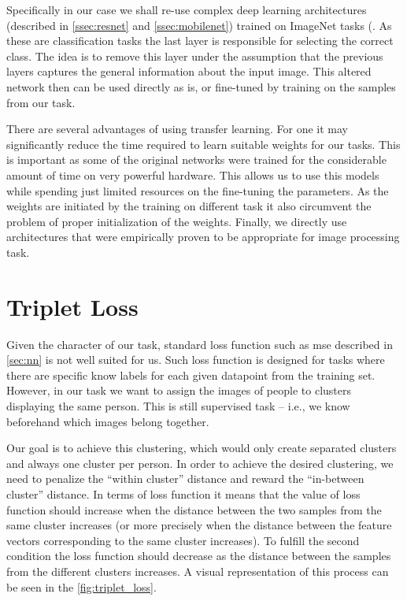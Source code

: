 Specifically in our case we shall re-use complex deep learning architectures
(described in \autoref{ssec:resnet} and \autoref{ssec:mobilenet}) trained on
ImageNet tasks (\cite{imagenetresults}. As these are classification tasks
the last layer is responsible for selecting the correct class. The idea
is to remove this layer under the assumption that the previous layers
captures the general information about the input image. This altered
network then can be used directly as is, or fine-tuned by training on the
samples from our task.

There are several advantages of using transfer learning. For one it may
significantly reduce the time required to learn suitable weights for our
tasks. This is important as some of the original networks were trained
for the considerable amount of time on very powerful hardware. This allows
us to use this models while spending just limited resources on the fine-tuning
the parameters. As the weights are initiated by the training on different
task it also circumvent the problem of proper initialization of the weights.
Finally, we directly use architectures that were empirically proven to be
appropriate for image processing task.


\section{Triplet Loss}

\label{sec:triplet_loss}

Given the character of our task, standard loss function such as \gls{mse}
described in \autoref{sec:nn} is not well suited for us. Such loss function
is designed for tasks where there are specific know labels for each given
datapoint from the training set. However, in our task we want to assign the
images of people to clusters displaying the same person. This is still
supervised task -- i.e., we know beforehand which images belong together.

Our goal is to achieve this clustering, which would only create separated clusters and always one cluster per person.
In order to achieve the desired clustering, we need to penalize the ``within
cluster'' distance and reward the ``in-between cluster'' distance. In terms
of loss function it means that the value of loss function should increase
when the distance between the two samples from the same cluster increases (or more
precisely when the distance between the feature vectors corresponding to the same cluster increases). To fulfill the second condition the loss function should
decrease as the distance between the samples from the different clusters increases. 
A visual representation of this process can be seen in the \autoref{fig:triplet_loss}.

